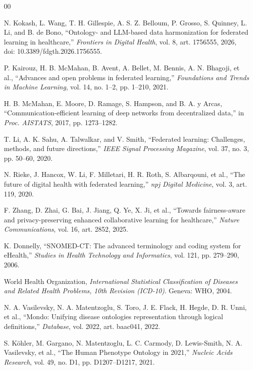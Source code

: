 \documentclass[conference]{IEEEtran}
\begin{document}
\begin{thebibliography}{00}

 N. Kokash, L. Wang, T. H. Gillespie, A. S. Z. Belloum, P. Grosso, S. Quinney, L. Li, and B. de Bono, ``Ontology- and LLM-based data harmonization for federated learning in healthcare,'' \emph{Frontiers in Digital Health}, vol. 8, art. 1756555, 2026, doi: 10.3389/fdgth.2026.1756555.

 P. Kairouz, H. B. McMahan, B. Avent, A. Bellet, M. Bennis, A. N. Bhagoji, et al., ``Advances and open problems in federated learning,'' \emph{Foundations and Trends in Machine Learning}, vol. 14, no. 1--2, pp. 1--210, 2021.

 H. B. McMahan, E. Moore, D. Ramage, S. Hampson, and B. A. y Arcas, ``Communication-efficient learning of deep networks from decentralized data,'' in \emph{Proc. AISTATS}, 2017, pp. 1273--1282.

 T. Li, A. K. Sahu, A. Talwalkar, and V. Smith, ``Federated learning: Challenges, methods, and future directions,'' \emph{IEEE Signal Processing Magazine}, vol. 37, no. 3, pp. 50--60, 2020.

 N. Rieke, J. Hancox, W. Li, F. Milletari, H. R. Roth, S. Albarqouni, et al., ``The future of digital health with federated learning,'' \emph{npj Digital Medicine}, vol. 3, art. 119, 2020.

 F. Zhang, D. Zhai, G. Bai, J. Jiang, Q. Ye, X. Ji, et al., ``Towards fairness-aware and privacy-preserving enhanced collaborative learning for healthcare,'' \emph{Nature Communications}, vol. 16, art. 2852, 2025.

 K. Donnelly, ``SNOMED-CT: The advanced terminology and coding system for eHealth,'' \emph{Studies in Health Technology and Informatics}, vol. 121, pp. 279--290, 2006.

 World Health Organization, \emph{International Statistical Classification of Diseases and Related Health Problems, 10th Revision (ICD-10)}. Geneva: WHO, 2004.

 N. A. Vasilevsky, N. A. Matentzoglu, S. Toro, J. E. Flack, H. Hegde, D. R. Unni, et al., ``Mondo: Unifying disease ontologies representation through logical definitions,'' \emph{Database}, vol. 2022, art. baac041, 2022.

 S. K\"ohler, M. Gargano, N. Matentzoglu, L. C. Carmody, D. Lewis-Smith, N. A. Vasilevsky, et al., ``The Human Phenotype Ontology in 2021,'' \emph{Nucleic Acids Research}, vol. 49, no. D1, pp. D1207--D1217, 2021.


\end{thebibliography}
\end{document}
